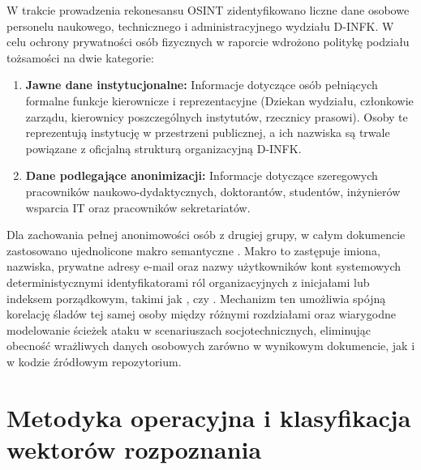 W trakcie prowadzenia rekonesansu OSINT zidentyfikowano liczne dane osobowe personelu naukowego, technicznego i administracyjnego wydziału D-INFK. W celu ochrony prywatności osób fizycznych w raporcie wdrożono politykę podziału tożsamości na dwie kategorie:
\begin{enumerate}
    \item \textbf{Jawne dane instytucjonalne:} Informacje dotyczące osób pełniących formalne funkcje kierownicze i reprezentacyjne (Dziekan wydziału, członkowie zarządu, kierownicy poszczególnych instytutów, rzecznicy prasowi). Osoby te reprezentują instytucję w przestrzeni publicznej, a ich nazwiska są trwale powiązane z oficjalną strukturą organizacyjną D-INFK.
    \item \textbf{Dane podlegające anonimizacji:} Informacje dotyczące szeregowych pracowników naukowo-dydaktycznych, doktorantów, studentów, inżynierów wsparcia IT oraz pracowników sekretariatów.
\end{enumerate}

Dla zachowania pełnej anonimowości osób z drugiej grupy, w całym dokumencie zastosowano ujednolicone makro semantyczne . Makro to zastępuje imiona, nazwiska, prywatne adresy e-mail oraz nazwy użytkowników kont systemowych deterministycznymi identyfikatorami ról organizacyjnych z inicjałami lub indeksem porządkowym, takimi jak ,  czy . Mechanizm ten umożliwia spójną korelację śladów tej samej osoby między różnymi rozdziałami oraz wiarygodne modelowanie ścieżek ataku w scenariuszach socjotechnicznych, eliminując obecność wrażliwych danych osobowych zarówno w wynikowym dokumencie, jak i w kodzie źródłowym repozytorium.

\section{Metodyka operacyjna i klasyfikacja wektorów rozpoznania}\label{sec:warsztat-narzedziowy}


